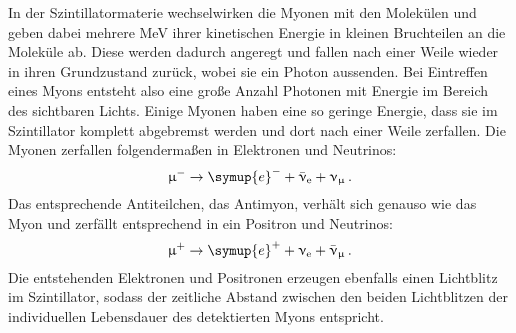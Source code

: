 In der Szintillatormaterie wechselwirken die Myonen mit den Molekülen und geben dabei mehrere MeV ihrer kinetischen Energie in kleinen
Bruchteilen an die Moleküle ab. Diese werden dadurch angeregt und fallen nach einer Weile wieder in ihren Grundzustand zurück, wobei
sie ein Photon aussenden. Bei Eintreffen eines Myons entsteht also eine große Anzahl Photonen mit Energie im Bereich des sichtbaren
Lichts. Einige Myonen haben eine so geringe Energie, dass sie im Szintillator komplett abgebremst werden und dort nach einer Weile
zerfallen. Die Myonen zerfallen folgendermaßen in Elektronen und Neutrinos:
\begin{equation*}
  \upmu^- \to \symup{e}^- + \bar{\upnu}_\text{e} + \upnu_{\upmu} \,.
\end{equation*}
Das entsprechende Antiteilchen, das Antimyon, verhält sich genauso wie das Myon und zerfällt entsprechend in ein Positron und Neutrinos:
\begin{equation*}
  \upmu^+ \to \symup{e}^+ + \upnu_\text{e} + \bar{\upnu}_{\upmu} \,.
\end{equation*}
Die entstehenden Elektronen und Positronen erzeugen ebenfalls einen Lichtblitz im Szintillator, sodass der zeitliche Abstand zwischen
den beiden Lichtblitzen der individuellen Lebensdauer des detektierten Myons entspricht.

